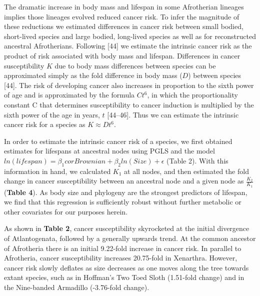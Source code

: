 \documentclass[]{elsarticle} %
\begin{document}
The dramatic increase in body mass and lifespan in some Afrotherian
lineages implies those lineages evolved reduced cancer risk. To infer
the magnitude of these reductions we estimated differences in cancer
risk between small bodied, short-lived species and large bodied,
long-lived species as well as for reconstructed ancestral Afrotherians.
Following {[}44{]} we estimate the intrinsic cancer risk as the product
of risk associated with body mass and lifespan. Differences in cancer
susceptibility \(K\) due to body mass differences between species can be
approximated simply as the fold difference in body mass (\(D\)) between
species {[}44{]}. The risk of developing cancer also increases in
proportion to the sixth power of age and is approximated by the formula
\(Ct^6\), in which the proportionality constant C that determines
susceptibility to cancer induction is multiplied by the sixth power of
the age in years, \(t\) {[}44--46{]}. Thus we can estimate the intrinsic
cancer risk for a species as \(K \approx Dt^6\).

In order to estimate the intrinsic cancer risk of a species, we first
obtained estimates for lifespans at ancestral nodes using PGLS and the
model
\(ln(lifespan) = \beta_{1}corBrownian +\beta_{2}ln(Size) + \epsilon\)
(Table 2). With this information in hand, we calculated \(K_{1}\) at all
nodes, and then estimated the fold change in cancer susceptibility
between an ancestral node and a given node as \(\frac{K_{2}}{K_{1}}\)
(\textbf{Table 4}). As body size and phylogeny are the strongest
predictors of lifespan, we find that this regression is sufficiently
robust without further metabolic or other covariates for our purposes
herein.

As shown in \textbf{Table 2}, cancer susceptibility skyrocketed at the
initial divergence of Atlantogenata, followed by a generally upwards
trend. At the common ancestor of Afrotheria there is an initial
9.22-fold increase in cancer risk. In parallel to Afrotheria, cancer
susceptibility increases 20.75-fold in Xenarthra. However, cancer risk
slowly deflates as size decreases as one moves along the tree towards
extant species, such as in Hoffman's Two Toed Sloth (1.51-fold change)
and in the Nine-banded Armadillo (-3.76-fold change).
\end{document}
